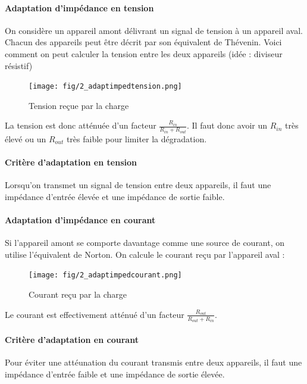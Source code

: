 \documentclass[a4paper]{article}
\begin{document}
    \paragraph{Adaptation d'impédance en tension} On considère un appareil amont
    délivrant un signal de tension à un appareil aval. Chacun des appareils
    peut être décrit par son équivalent de Thévenin. Voici comment on peut 
    calculer la tension entre les deux appareils (idée : diviseur résistif)

    \begin{figure}[H]
        \begin{center}
            \texttt{[image: fig/2\_adaptimpedtension.png]}
            \caption{Tension reçue par la charge}
            \label{fig:2_adaptimpedtension}
        \end{center}
    \end{figure}

    La tension est donc atténuée d'un facteur $\frac{R_{in}}{R_{in}+R_{out}}$. 
    Il faut donc avoir un $R_{in}$ très élevé ou un $R_{out}$ très faible
    pour limiter la dégradation.

    \paragraph{Critère d'adaptation en tension} Lorsqu'on transmet un signal
    de tension entre deux appareils, il faut une impédance d'entrée élevée
    et une impédance de sortie faible.

    \paragraph{Adaptation d'impédance en courant} Si l'appareil amont se comporte
    davantage comme une source de courant, on utilise l'équivalent de Norton.
    On calcule le courant reçu par l'appareil aval : 
    \begin{figure}[H]
        \begin{center}
            \texttt{[image: fig/2\_adaptimpedcourant.png]}
            \caption{Courant reçu par la charge}
            \label{fig:2_adaptimpedcourant}
        \end{center}
    \end{figure}
    Le courant est effectivement atténué d'un facteur $\frac{R_{out}}{R_{out}+R_{in}}$.

    \paragraph{Critère d'adaptation en courant} Pour éviter une attéunation du courant
    transmis entre deux appareils, il faut une impédance d'entrée faible
    et une impédance de sortie élevée.
\end{document}
